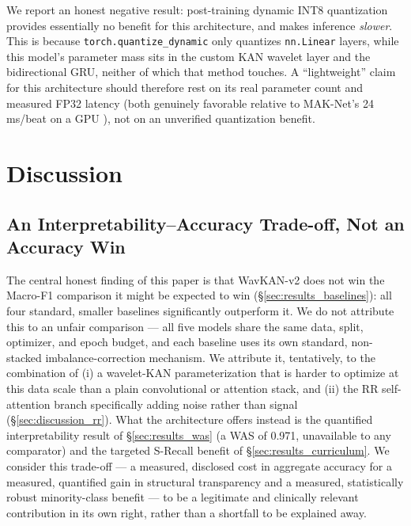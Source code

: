 \documentclass[journal,twoside,web]{ieeecolor}
\begin{document}
\noindent We report an honest negative result: post-training dynamic INT8 quantization provides essentially no benefit for this architecture, and makes inference \emph{slower}. This is because \texttt{torch.quantize\_dynamic} only quantizes \texttt{nn.Linear} layers, while this model's parameter mass sits in the custom KAN wavelet layer and the bidirectional GRU, neither of which that method touches. A ``lightweight'' claim for this architecture should therefore rest on its real parameter count and measured FP32 latency (both genuinely favorable relative to MAK-Net's 24 ms/beat on a GPU \cite{zhao_mak-net_2025}), not on an unverified quantization benefit.

\section{Discussion}
\label{sec:discussion}

\subsection{An Interpretability--Accuracy Trade-off, Not an Accuracy Win}
The central honest finding of this paper is that WavKAN-v2 does not win the Macro-F1 comparison it might be expected to win (\S\ref{sec:results_baselines}): all four standard, smaller baselines significantly outperform it. We do not attribute this to an unfair comparison --- all five models share the same data, split, optimizer, and epoch budget, and each baseline uses its own standard, non-stacked imbalance-correction mechanism. We attribute it, tentatively, to the combination of (i) a wavelet-KAN parameterization that is harder to optimize at this data scale than a plain convolutional or attention stack, and (ii) the RR self-attention branch specifically adding noise rather than signal (\S\ref{sec:discussion_rr}). What the architecture offers instead is the quantified interpretability result of \S\ref{sec:results_was} (a WAS of 0.971, unavailable to any comparator) and the targeted S-Recall benefit of \S\ref{sec:results_curriculum}. We consider this trade-off --- a measured, disclosed cost in aggregate accuracy for a measured, quantified gain in structural transparency and a measured, statistically robust minority-class benefit --- to be a legitimate and clinically relevant contribution in its own right, rather than a shortfall to be explained away.
\end{document}
